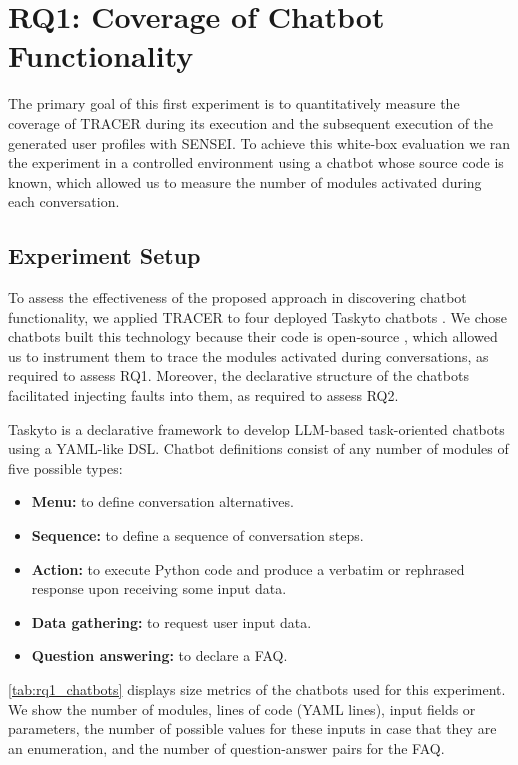 \section{RQ1: Coverage of Chatbot Functionality}

The primary goal of this first experiment
is to quantitatively measure the coverage
of \ac{TRACER} during its execution and
the subsequent execution of the generated user profiles with SENSEI.
To achieve this white-box evaluation
we ran the experiment in a controlled environment
using a chatbot whose source code is known,
which allowed us to measure the number of modules activated
during each conversation.

\subsection{Experiment Setup}

To assess the effectiveness of the proposed approach in discovering chatbot functionality,
we applied \ac{TRACER} to four deployed Taskyto chatbots
\autocite{sanchezcuadradoAutomatingDevelopmentTaskoriented2024}.
We chose chatbots built this technology because their code is open-source
\autocite{SatorichatbotsTaskyto2025},
which allowed us to instrument them
to trace the modules activated during conversations,
as required to assess RQ1.
Moreover, the declarative structure of the chatbots
facilitated injecting faults into them, as required to assess RQ2.

Taskyto is a declarative framework
to develop LLM-based task-oriented chatbots using a YAML-like DSL.
Chatbot definitions consist of any number of modules of five possible types:

\begin{itemize}
  \item 
    \textbf{Menu:} to define conversation alternatives.
\item
  \textbf{Sequence:} to define a sequence of conversation steps.
\item
  \textbf{Action:} to execute Python code and produce a
verbatim or rephrased response upon receiving some input data.
\item
  \textbf{Data gathering:} to request user input data.
\item
  \textbf{Question answering:} to declare a FAQ.
\end{itemize}


\autoref{tab:rq1_chatbots} displays size metrics
of the chatbots used for this experiment.
We show the number of modules, lines of code (YAML lines),
input fields or parameters,
the number of possible values for these inputs in case that they are an enumeration,
and the number of question-answer pairs for the FAQ.

